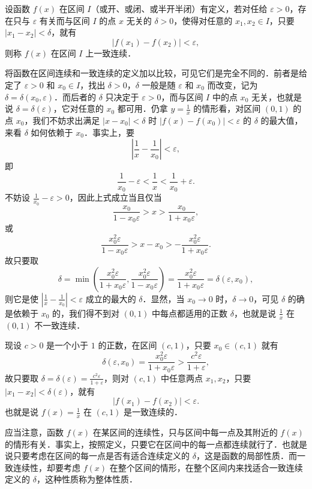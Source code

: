 \begin{definition}\label{def:7-2}
设函数 $f(x)$ 在区间 $I$（或开、或闭、或半开半闭）有定义，若对任给 $\varepsilon > 0$，存在只与 $\varepsilon$ 有关而与区间 $I$ 的点 $x$ 无关的 $\delta > 0$，使得对任意的 $x_1, x_2 \in I$，只要 $|x_1 - x_2| < \delta$，就有
\[
|f(x_1) - f(x_2)| < \varepsilon,
\]
则称 $f(x)$ 在区间 $I$ 上一致连续．
\end{definition}

将函数在区间连续和一致连续的定义加以比较，可见它们是完全不同的．前者是给定了 $\varepsilon > 0$ 和 $x_0 \in I$，找出 $\delta > 0$，$\delta$ 一般是随 $\varepsilon$ 和 $x_0$ 而改变，记为 $\delta = \delta(x_0, \varepsilon)$．而后者的 $\delta$ 只决定于 $\varepsilon > 0$，而与区间 $I$ 中的点 $x_0$ 无关，也就是说 $\delta = \delta(\varepsilon)$，它对任意的 $x_0$ 都可用．仍拿 $y = \frac{1}{x}$ 的情形看，对区间 $(0,1)$ 的点 $x_0$，我们不妨求出满足 $|x - x_0| < \delta$ 时 $|f(x) - f(x_0)| < \varepsilon$ 的 $\delta$ 的最大值，来看 $\delta$ 如何依赖于 $x_0$．事实上，要
\[
\left|\frac{1}{x} - \frac{1}{x_0}\right| < \varepsilon,
\]
即
\[
\frac{1}{x_0} - \varepsilon < \frac{1}{x} < \frac{1}{x_0} + \varepsilon.
\]
不妨设 $\frac{1}{x_0} - \varepsilon > 0$，因此上式成立当且仅当
\[
\frac{x_0}{1 - x_0 \varepsilon} > x > \frac{x_0}{1 + x_0 \varepsilon},
\]
或
\[
\frac{x_0^2 \varepsilon}{1 - x_0 \varepsilon} > x - x_0 > -\frac{x_0^2 \varepsilon}{1 + x_0 \varepsilon}.
\]
故只要取
\[
\delta = \min\left(\frac{x_0^2 \varepsilon}{1 + x_0 \varepsilon}, \frac{x_0^2 \varepsilon}{1 - x_0 \varepsilon}\right) = \frac{x_0^2 \varepsilon}{1 + x_0 \varepsilon} = \delta(\varepsilon, x_0),
\]
则它是使 $\left|\frac{1}{x} - \frac{1}{x_0}\right| < \varepsilon$ 成立的最大的 $\delta$．显然，当 $x_0 \to 0$ 时，$\delta \to 0$，可见 $\delta$ 的确是依赖于 $x_0$ 的，我们得不到对 $(0,1)$ 中每点都适用的正数 $\delta$，也就是说 $\frac{1}{x}$ 在 $(0,1)$ 不一致连续．

现设 $c > 0$ 是一个小于 $1$ 的正数，在区间 $(c,1)$，只要 $x_0 \in (c,1)$ 就有
\[
\delta(\varepsilon, x_0) = \frac{x_0^2 \varepsilon}{1 + x_0 \varepsilon} > \frac{c^2 \varepsilon}{1 + \varepsilon},
\]
故只要取 $\delta = \delta(\varepsilon) = \frac{c^2 \varepsilon}{1 + \varepsilon}$，则对 $(c,1)$ 中任意两点 $x_1, x_2$，只要 $|x_1 - x_2| < \delta(\varepsilon)$，就有
\[
|f(x_1) - f(x_2)| < \varepsilon.
\]
也就是说 $f(x) = \frac{1}{x}$ 在 $(c,1)$ 是一致连续的．

应当注意，函数 $f(x)$ 在某区间的连续性，只与区间中每一点及其附近的 $f(x)$ 的情形有关．事实上，按照定义，只要它在区间中的每一点都连续就行了．也就是说只要考虑在区间的每一点是否有适合连续定义的 $\delta$，这是函数的局部性质．而一致连续性，却要考虑 $f(x)$ 在整个区间的情形，在整个区间内来找适合一致连续定义的 $\delta$，这种性质称为整体性质．

